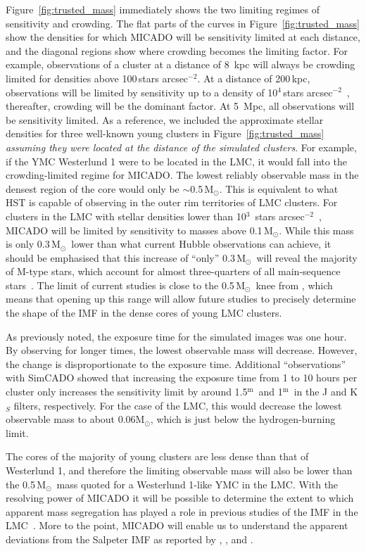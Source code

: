 \documentclass[referee]{aa}
\newcommand{\m}{$^\mathrm{m}$~}
\newcommand{\msun}{M$_\odot$~}
\newcommand{\msune}{M$_\odot$}
\newcommand{\s}{$\sim$}
\newcommand{\h}[1]{$^{#1}$}
\newcommand{\spa}{stars arcsec$^{-2}$~}
\newcommand{\spae}{stars arcsec$^{-2}$}
\begin{document}
Figure~\ref{fig:trusted_mass} immediately shows the two limiting regimes of sensitivity and crowding.
The flat parts of the curves in Figure~\ref{fig:trusted_mass} show the densities for which MICADO will be sensitivity limited at each distance, and the diagonal regions show where crowding becomes the limiting factor.
For example, observations of a cluster at a distance of 8\, kpc will always be crowding limited for densities above 100\,\spae.
At a distance of 200\,kpc, observations will be limited by sensitivity up to a density of 10\h4\,\spa, thereafter, crowding will be the dominant factor.
At 5\, Mpc, all observations will be sensitivity limited.
As a reference, we included the approximate stellar densities for three well-known young clusters in Figure~\ref{fig:trusted_mass} \textit{\textup{assuming they were located at the distance of the simulated clusters}}.
For example, if the YMC Westerlund 1 were to be located in the LMC, it would fall into the crowding-limited regime for MICADO\@.
The lowest reliably observable mass in the densest region of the core would only be \s0.5\,\msune.
This is equivalent to what HST is capable of observing in the outer rim territories of LMC clusters.
For clusters in the LMC with stellar densities lower than 10\h3~\spa , MICADO will be limited by sensitivity to masses above 0.1\,\msune.
While this mass is only 0.3\,\msun lower than what current Hubble observations can achieve, it should be emphasised that this increase of ``only'' 0.3\,\msun will reveal the majority of M-type stars, which account for almost three-quarters of all main-sequence stars~\citep{ledrew2001}.
The limit of current studies is close to the 0.5\,\msun knee from \citet{kroupa2001}, which means that opening up this range will allow future studies to precisely determine the shape of the IMF in the dense cores of young LMC clusters.

As previously noted, the exposure time for the simulated images was one hour.
By observing for longer times, the lowest observable mass will decrease.
However, the change is disproportionate to the exposure time.
Additional ``observations'' with SimCADO showed that increasing the exposure time from 1 to 10 hours per cluster only increases the sensitivity limit by around 1.5\m and 1\m in the J and K$_S$ filters, respectively.
For the case of the LMC, this would decrease the lowest observable mass to about 0.06\msune, which is just below the hydrogen-burning limit.

The cores of the majority of young clusters are less dense than that of Westerlund 1, and therefore the limiting observable mass will also be lower than the 0.5\,\msun mass quoted for a Westerlund 1-like YMC in the LMC\@.
With the resolving power of MICADO it will be possible to determine the extent to which apparent mass segregation has played a role in previous studies of the IMF in the LMC~\citep{Ascenso2009-de}.
More to the point, MICADO will enable us to understand the apparent deviations from the Salpeter IMF as reported by \citet{dario2009}, \citet{geha2013}, and \citet{kalirai2013}.
\end{document}
